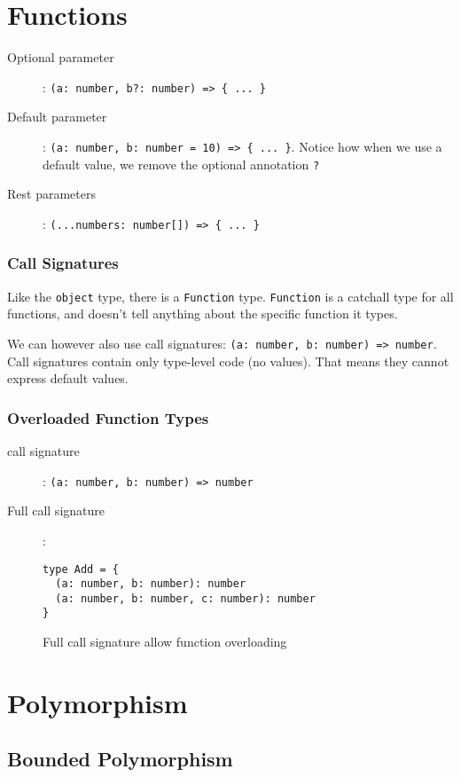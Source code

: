 \documentclass[french]{article}
\begin{document}
\section{Functions}

\begin{description}
  \item[Optional parameter]: \lstinline|(a: number, b?: number) => { ... }|
  \item[Default parameter]: \lstinline|(a: number, b: number = 10) => { ... }|. Notice how when we use a default value, we remove the optional annotation \lstinline{?}
  \item[Rest parameters]: \lstinline|(...numbers: number[]) => { ... }|
\end{description}

\subsubsection{Call Signatures}

Like the \lstinline{object} type, there is a \lstinline{Function} type. \lstinline{Function} is a catchall type for all functions, and doesn't tell anything about the specific function it types.

We can however also use call signatures: \lstinline{(a: number, b: number) => number}. Call signatures contain only type-level code (no values). That means they cannot express default values.

\subsubsection{Overloaded Function Types}

\begin{description}
  \item[call signature]: \lstinline{(a: number, b: number) => number}
  \item[Full call signature]:
    \begin{lstlisting}
type Add = {
  (a: number, b: number): number
  (a: number, b: number, c: number): number
}
    \end{lstlisting}
    Full call signature allow function overloading
\end{description}

\section{Polymorphism}

\subsection{Bounded Polymorphism}
\end{document}
